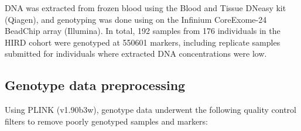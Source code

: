 DNA was extracted from frozen blood using the Blood and Tissue DNeasy kit (Qiagen), and genotyping was done using on the Infinium CoreExome-24 BeadChip array (Illumina).
In total, 192 samples from 176 individuals in the \gls{HIRD} cohort were genotyped at \num{550601} markers, including replicate samples submitted for individuals where extracted DNA concentrations were low.

\subsection{Genotype data preprocessing}
\label{subsec:hird_dge_genotype_preproc}


Using PLINK (v1.90b3w), genotype data underwent the following quality control filters to remove poorly genotyped samples and markers:
